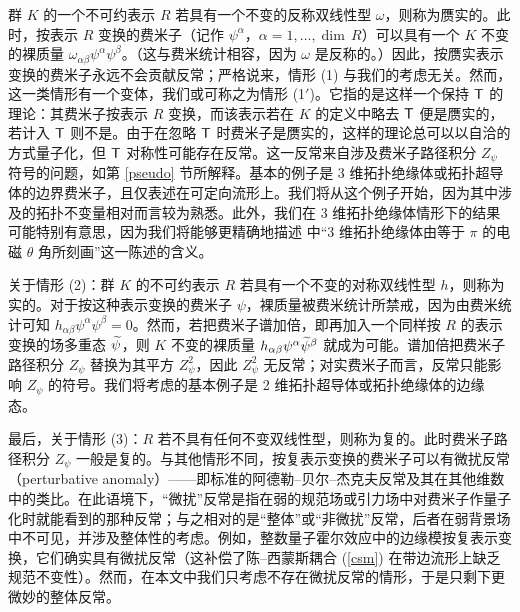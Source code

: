 群 $K$ 的一个不可约表示 $R$ 若具有一个不变的反称双线性型 $\omega$，则称为赝实的。此时，按表示 $R$ 变换的费米子（记作 $\psi^\alpha$，$\alpha=1,\dots,\dim\,R$）可以具有一个 $K$ 不变的裸质量 $\omega_{\alpha\beta}\psi^\alpha\psi^\beta$。（这与费米统计相容，因为 $\omega$ 是反称的。）因此，按赝实表示变换的费米子永远不会贡献反常；严格说来，情形 (1) 与我们的考虑无关。然而，这一类情形有一个变体，我们或可称之为情形 (1$'$)。它指的是这样一个保持 ${\sf T}$ 的理论：其费米子按表示 $R$ 变换，而该表示若在 $K$ 的定义中略去 ${\sf T}$ 便是赝实的，若计入 ${\sf T}$ 则不是。由于在忽略 ${\sf T}$ 时费米子是赝实的，这样的理论总可以以自洽的方式量子化，但 ${\sf T}$ 对称性可能存在反常。这一反常来自涉及费米子路径积分 $Z_\psi$ 符号的问题，如第 \ref{pseudo} 节所解释。基本的例子是 3 维拓扑绝缘体或拓扑超导体的边界费米子，且仅表述在可定向流形上。我们将从这个例子开始，因为其中涉及的拓扑不变量相对而言较为熟悉。此外，我们在 3 维拓扑绝缘体情形下的结果可能特别有意思，因为我们将能够更精确地描述 \cite{ZQH} 中“3 维拓扑绝缘体由等于 $\pi$ 的电磁 $\theta$ 角所刻画”这一陈述的含义。

关于情形 (2)：群 $K$ 的不可约表示 $R$ 若具有一个不变的对称双线性型 $h$，则称为实的。对于按这种表示变换的费米子 $\psi$，裸质量被费米统计所禁戒，因为由费米统计可知 $h_{\alpha\beta}\psi^\alpha\psi^\beta =0$。然而，若把费米子谱加倍，即再加入一个同样按 $R$ 的表示变换的场多重态 $\widetilde\psi$，则 $K$ 不变的裸质量 $h_{\alpha\beta}\psi^\alpha\widetilde\psi^\beta$ 就成为可能。谱加倍把费米子路径积分 $Z_\psi$ 替换为其平方 $Z_\psi^2$，因此 $Z_\psi^2$ 无反常；对实费米子而言，反常只能影响 $Z_\psi$ 的符号。我们将考虑的基本例子是 2 维拓扑超导体或拓扑绝缘体的边缘态。

最后，关于情形 (3)：$R$ 若不具有任何不变双线性型，则称为复的。此时费米子路径积分 $Z_\psi$ 一般是复的。与其他情形不同，按复表示变换的费米子可以有微扰反常（perturbative anomaly）------即标准的阿德勒--贝尔--杰克夫反常及其在其他维数中的类比。在此语境下，“微扰”反常是指在弱的规范场或引力场中对费米子作量子化时就能看到的那种反常；与之相对的是“整体”或“非微扰”反常，后者在弱背景场中不可见，并涉及整体性的考虑。例如，整数量子霍尔效应中的边缘模按复表示变换，它们确实具有微扰反常（这补偿了陈--西蒙斯耦合 (\ref{csm}) 在带边流形上缺乏规范不变性）。然而，在本文中我们只考虑不存在微扰反常的情形，于是只剩下更微妙的整体反常。


